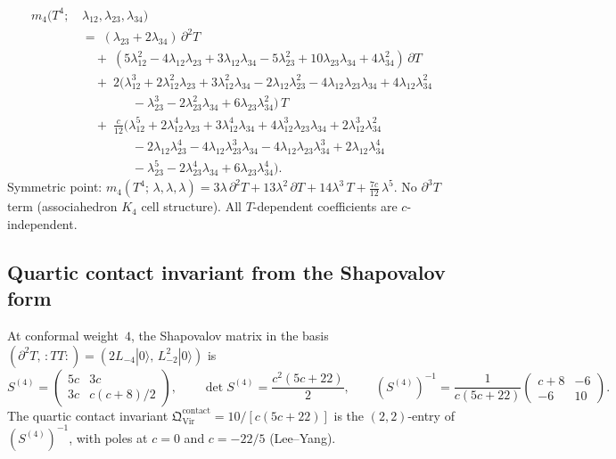 \documentclass[11pt]{article}
\newcommand{\normord}[1]{:\!#1\!:}
\begin{document}
\begin{equation}\label{eq:m4-stable}
\begin{aligned}
m_4(T^4;\,&\lambda_{12},\lambda_{23},\lambda_{34})
\\[2pt]
&=\;
(\lambda_{23} + 2\lambda_{34})\,\partial^2 T
\\[2pt]
&\quad +\;
(5\lambda_{12}^2 - 4\lambda_{12}\lambda_{23}
  + 3\lambda_{12}\lambda_{34}
  - 5\lambda_{23}^2 + 10\lambda_{23}\lambda_{34}
  + 4\lambda_{34}^2)\,\partial T
\\[2pt]
&\quad +\;
2(\lambda_{12}^3 + 2\lambda_{12}^2\lambda_{23}
  + 3\lambda_{12}^2\lambda_{34}
  - 2\lambda_{12}\lambda_{23}^2
  - 4\lambda_{12}\lambda_{23}\lambda_{34}
  + 4\lambda_{12}\lambda_{34}^2
\\
&\qquad\qquad
  - \lambda_{23}^3 - 2\lambda_{23}^2\lambda_{34}
  + 6\lambda_{23}\lambda_{34}^2)\,T
\\[2pt]
&\quad +\;
\tfrac{c}{12}
(\lambda_{12}^5 + 2\lambda_{12}^4\lambda_{23}
  + 3\lambda_{12}^4\lambda_{34}
  + 4\lambda_{12}^3\lambda_{23}\lambda_{34}
  + 2\lambda_{12}^3\lambda_{34}^2
\\
&\qquad\qquad
  - 2\lambda_{12}\lambda_{23}^4
  - 4\lambda_{12}\lambda_{23}^3\lambda_{34}
  - 4\lambda_{12}\lambda_{23}\lambda_{34}^3
  + 2\lambda_{12}\lambda_{34}^4
\\
&\qquad\qquad
  - \lambda_{23}^5 - 2\lambda_{23}^4\lambda_{34}
  + 6\lambda_{23}\lambda_{34}^4).
\end{aligned}
\end{equation}
Symmetric point:
$m_4(T^4;\,\lambda,\lambda,\lambda)
= 3\lambda\,\partial^2 T
+ 13\lambda^2\,\partial T
+ 14\lambda^3\, T
+ \tfrac{7c}{12}\,\lambda^5$.
No $\partial^3 T$ term (associahedron $K_4$ cell structure).
All $T$-dependent coefficients are $c$-independent.

\subsection{Quartic contact invariant from the Shapovalov form}

At conformal weight~$4$, the Shapovalov matrix in the basis
$(\partial^2 T,\, \normord{TT}) = (2L_{-4}|0\rangle,\,
L_{-2}^2|0\rangle)$ is
\[
S^{(4)}
=
\begin{pmatrix}
5c & 3c \\
3c & c(c+8)/2
\end{pmatrix},
\qquad
\det S^{(4)} = \frac{c^2(5c+22)}{2},
\qquad
(S^{(4)})^{-1}
=
\frac{1}{c(5c+22)}
\begin{pmatrix}
c+8 & -6 \\
-6 & 10
\end{pmatrix}.
\]
The quartic contact invariant
$\mathfrak{Q}^{\mathrm{contact}}_{\mathrm{Vir}}
= 10/[c(5c+22)]$
is the $(2,2)$-entry of $(S^{(4)})^{-1}$, with poles at
$c = 0$ and $c = -22/5$ (Lee--Yang).
\end{document}
